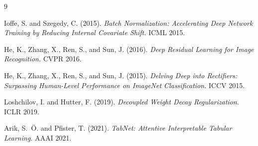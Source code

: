 \documentclass[12pt, a4paper]{article}
\begin{document}
\begin{thebibliography}{9}

Ioffe, S. and Szegedy, C. (2015).
\textit{Batch Normalization: Accelerating Deep Network Training by Reducing Internal Covariate Shift.}
ICML 2015.

He, K., Zhang, X., Ren, S., and Sun, J. (2016).
\textit{Deep Residual Learning for Image Recognition.}
CVPR 2016.

He, K., Zhang, X., Ren, S., and Sun, J. (2015).
\textit{Delving Deep into Rectifiers: Surpassing Human-Level Performance on ImageNet Classification.}
ICCV 2015.

Loshchilov, I. and Hutter, F. (2019).
\textit{Decoupled Weight Decay Regularization.}
ICLR 2019.

Arik, S.~Ö. and Pfister, T. (2021).
\textit{TabNet: Attentive Interpretable Tabular Learning.}
AAAI 2021.

\end{thebibliography}
\end{document}
